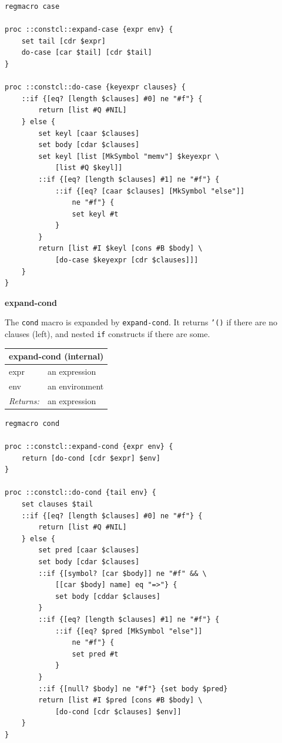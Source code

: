 \documentclass[twoside,9pt]{report}
\begin{document}
\noindent\makebox[\linewidth]{\rule{\linewidth}{0.4pt}}
\begin{lstlisting}
regmacro case
 
proc ::constcl::expand-case {expr env} {
    set tail [cdr $expr]
    do-case [car $tail] [cdr $tail]
}
 
proc ::constcl::do-case {keyexpr clauses} {
    ::if {[eq? [length $clauses] #0] ne "#f"} {
        return [list #Q #NIL]
    } else {
        set keyl [caar $clauses]
        set body [cdar $clauses]
        set keyl [list [MkSymbol "memv"] $keyexpr \
            [list #Q $keyl]]
        ::if {[eq? [length $clauses] #1] ne "#f"} {
            ::if {[eq? [caar $clauses] [MkSymbol "else"]]
                ne "#f"} {
                set keyl #t
            }
        }
        return [list #I $keyl [cons #B $body] \
            [do-case $keyexpr [cdr $clauses]]]
    }
}
\end{lstlisting}
\noindent\makebox[\linewidth]{\rule{\linewidth}{0.4pt}}

\textbf{expand-cond}


The \texttt{cond} macro is expanded by \texttt{expand-cond}. It returns \texttt{'()} if there are no clauses (left), and nested \texttt{if} constructs if there are some.

\begin{tabular}{ |l l| }
\hline
\multicolumn{2}{|l|}{expand-cond (internal)} \\
\hline
expr & an expression \\
env & an environment \\
\textit{Returns:} & an expression \\
\hline
\end{tabular}

\noindent\makebox[\linewidth]{\rule{\linewidth}{0.4pt}}
\begin{lstlisting}
regmacro cond
 
proc ::constcl::expand-cond {expr env} {
    return [do-cond [cdr $expr] $env]
}
 
proc ::constcl::do-cond {tail env} {
    set clauses $tail
    ::if {[eq? [length $clauses] #0] ne "#f"} {
        return [list #Q #NIL]
    } else {
        set pred [caar $clauses]
        set body [cdar $clauses]
        ::if {[symbol? [car $body]] ne "#f" && \
            [[car $body] name] eq "=>"} {
            set body [cddar $clauses]
        }
        ::if {[eq? [length $clauses] #1] ne "#f"} {
            ::if {[eq? $pred [MkSymbol "else"]]
                ne "#f"} {
                set pred #t
            }
        }
        ::if {[null? $body] ne "#f"} {set body $pred}
        return [list #I $pred [cons #B $body] \
            [do-cond [cdr $clauses] $env]]
    }
}
\end{lstlisting}
\noindent\makebox[\linewidth]{\rule{\linewidth}{0.4pt}}
\end{document}
